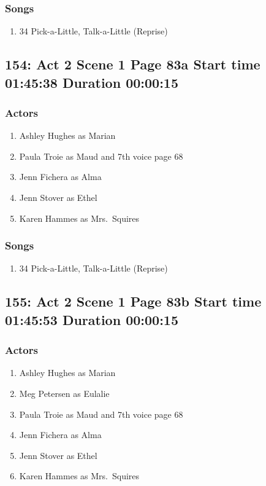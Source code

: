\subsubsection{Songs}
\begin{enumerate}
\item 34 Pick-a-Little, Talk-a-Little (Reprise)
\end{enumerate}
\subsection{154: Act 2 Scene 1 Page 83a Start time 01:45:38 Duration 00:00:15}

\subsubsection{Actors}
\begin{enumerate}
\item Ashley Hughes as Marian
\item Paula Troie as Maud and 7th voice page 68
\item Jenn Fichera as Alma
\item Jenn Stover as Ethel
\item Karen Hammes as Mrs.~Squires
\end{enumerate}

\subsubsection{Songs}
\begin{enumerate}
\item 34 Pick-a-Little, Talk-a-Little (Reprise)
\end{enumerate}
\subsection{155: Act 2 Scene 1 Page 83b Start time 01:45:53 Duration 00:00:15}

\subsubsection{Actors}
\begin{enumerate}
\item Ashley Hughes as Marian
\item Meg Petersen as Eulalie
\item Paula Troie as Maud and 7th voice page 68
\item Jenn Fichera as Alma
\item Jenn Stover as Ethel
\item Karen Hammes as Mrs.~Squires
\end{enumerate}

